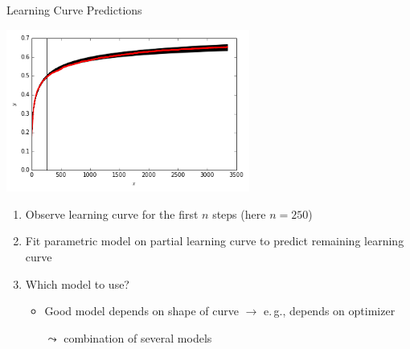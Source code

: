 \begin{frame}[c,fragile]{Learning Curve Predictions}

\centering
\includegraphics[width=0.6\textwidth]{images/learning_curve_single_pred}

\begin{enumerate}
  \item Observe learning curve for the first $n$ steps (here $n=250$)
  \pause
  \item Fit parametric model on partial learning curve to predict remaining learning curve
  \pause
  \item Which model to use? 
  \begin{itemize}
    \item Good model depends on shape of curve $\to$ e.$\,$g., depends on optimizer  
    \item[$\leadsto$] combination of several models
  \end{itemize}
  
\end{enumerate}

\end{frame}


